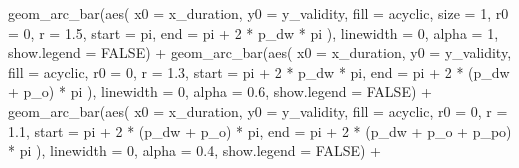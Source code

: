 \documentclass[
  letterpaper,
  DIV=11,
  numbers=noendperiod]{scrartcl}
\newenvironment{Shaded}{\begin{snugshade}}{\end{snugshade}}
\newcommand{\AttributeTok}[1]{\textcolor[rgb]{0.40,0.45,0.13}{#1}}
\newcommand{\ConstantTok}[1]{\textcolor[rgb]{0.56,0.35,0.01}{#1}}
\newcommand{\DecValTok}[1]{\textcolor[rgb]{0.68,0.00,0.00}{#1}}
\newcommand{\FloatTok}[1]{\textcolor[rgb]{0.68,0.00,0.00}{#1}}
\newcommand{\FunctionTok}[1]{\textcolor[rgb]{0.28,0.35,0.67}{#1}}
\newcommand{\NormalTok}[1]{\textcolor[rgb]{0.00,0.23,0.31}{#1}}
\newcommand{\SpecialCharTok}[1]{\textcolor[rgb]{0.37,0.37,0.37}{#1}}
\begin{document}
\begin{Shaded}
\begin{Highlighting}[]
    \FunctionTok{geom\_arc\_bar}\NormalTok{(}\FunctionTok{aes}\NormalTok{(}
        \AttributeTok{x0 =}\NormalTok{ x\_duration, }
        \AttributeTok{y0 =}\NormalTok{ y\_validity,}
        \AttributeTok{fill =}\NormalTok{ acyclic,}
        \AttributeTok{size =} \DecValTok{1}\NormalTok{,}
        \AttributeTok{r0 =} \DecValTok{0}\NormalTok{,}
        \AttributeTok{r =} \FloatTok{1.5}\NormalTok{,}
        \AttributeTok{start =}\NormalTok{ pi, }
        \AttributeTok{end =}\NormalTok{ pi }\SpecialCharTok{+} \DecValTok{2} \SpecialCharTok{*}\NormalTok{ p\_dw }\SpecialCharTok{*}\NormalTok{ pi}
\NormalTok{    ), }
        \AttributeTok{linewidth =} \DecValTok{0}\NormalTok{,}
    \AttributeTok{alpha =} \DecValTok{1}\NormalTok{, }\AttributeTok{show.legend =} \ConstantTok{FALSE}\NormalTok{) }\SpecialCharTok{+} 
    \FunctionTok{geom\_arc\_bar}\NormalTok{(}\FunctionTok{aes}\NormalTok{(}
        \AttributeTok{x0 =}\NormalTok{ x\_duration, }
        \AttributeTok{y0 =}\NormalTok{ y\_validity,}
        \AttributeTok{fill =}\NormalTok{ acyclic,}
        \AttributeTok{r0 =} \DecValTok{0}\NormalTok{,}
        \AttributeTok{r =} \FloatTok{1.3}\NormalTok{,}
        \AttributeTok{start =}\NormalTok{ pi }\SpecialCharTok{+} \DecValTok{2} \SpecialCharTok{*}\NormalTok{ p\_dw }\SpecialCharTok{*}\NormalTok{ pi, }
        \AttributeTok{end =}\NormalTok{ pi }\SpecialCharTok{+} \DecValTok{2} \SpecialCharTok{*}\NormalTok{ (p\_dw }\SpecialCharTok{+}\NormalTok{ p\_o) }\SpecialCharTok{*}\NormalTok{ pi}
\NormalTok{    ), }
        \AttributeTok{linewidth =} \DecValTok{0}\NormalTok{,}
    \AttributeTok{alpha =} \FloatTok{0.6}\NormalTok{, }\AttributeTok{show.legend =} \ConstantTok{FALSE}\NormalTok{) }\SpecialCharTok{+} 
    \FunctionTok{geom\_arc\_bar}\NormalTok{(}\FunctionTok{aes}\NormalTok{(}
        \AttributeTok{x0 =}\NormalTok{ x\_duration, }
        \AttributeTok{y0 =}\NormalTok{ y\_validity,}
        \AttributeTok{fill =}\NormalTok{ acyclic,}
        \AttributeTok{r0 =} \DecValTok{0}\NormalTok{,}
        \AttributeTok{r =} \FloatTok{1.1}\NormalTok{,}
        \AttributeTok{start =}\NormalTok{ pi }\SpecialCharTok{+} \DecValTok{2} \SpecialCharTok{*}\NormalTok{ (p\_dw }\SpecialCharTok{+}\NormalTok{ p\_o) }\SpecialCharTok{*}\NormalTok{ pi, }
        \AttributeTok{end =}\NormalTok{ pi }\SpecialCharTok{+} \DecValTok{2} \SpecialCharTok{*}\NormalTok{ (p\_dw }\SpecialCharTok{+}\NormalTok{ p\_o }\SpecialCharTok{+}\NormalTok{ p\_po) }\SpecialCharTok{*}\NormalTok{ pi}
\NormalTok{    ), }
        \AttributeTok{linewidth =} \DecValTok{0}\NormalTok{,}
    \AttributeTok{alpha =} \FloatTok{0.4}\NormalTok{, }\AttributeTok{show.legend =} \ConstantTok{FALSE}\NormalTok{) }\SpecialCharTok{+} 

\end{Highlighting}
\end{Shaded}
\end{document}
